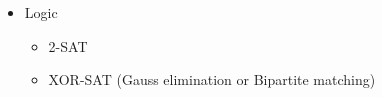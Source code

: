 \documentclass[8pt,a4paper,landscape,oneside]{amsart}
\newenvironment{myitemize}
{ \begin{itemize}[leftmargin=.5cm]
    \setlength{\itemsep}{0pt}
    \setlength{\parskip}{0pt}
    \setlength{\parsep}{0pt}     }
{ \end{itemize}                  }
\begin{document}
\begin{multicols*}{3}
\begin{myitemize}
\begin{itemize}
\begin{itemize}
                            \end{itemize}
                        \item Functions
                            \begin{itemize}
                                \item Sum of piecewise-linear functions is a piecewise-linear function
                                \item Sum of convex (concave) functions is convex (concave)
                            \end{itemize}
                        \item Modular arithmetic
                            \begin{itemize}
                                \item Chinese Remainder Theorem
                                \item Linear Congruence
                            \end{itemize}
                        \item Sieve
                        \item System of linear equations
                        \item Values too big to represent?
                            \begin{itemize}
                                \item Compute using the logarithm
                                \item Divide everything by some large value
                            \end{itemize}
                        \item Linear programming
                            \begin{itemize}
                                \item Is the dual problem easier to solve?
                            \end{itemize}
                        \item Can the problem be modeled as a different combinatorial problem? Does that simplify calculations?
                    \end{itemize}
                \item Logic
                    \begin{itemize}
                        \item 2-SAT
                        \item XOR-SAT (Gauss elimination or Bipartite matching)

\end{itemize}
\end{myitemize}
\end{multicols*}
\end{document}
